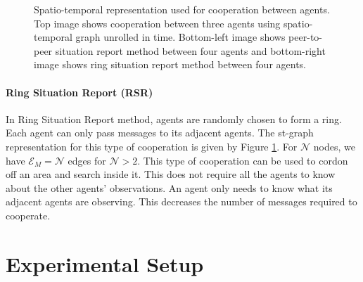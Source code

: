 \documentclass[conference]{IEEEtran}
\begin{document}
\begin{figure}[t]
        \vspace{1mm}
     \caption{Spatio-temporal representation used for cooperation between agents. Top image shows cooperation between three agents using spatio-temporal graph unrolled in time. Bottom-left image shows peer-to-peer situation report method between four agents and bottom-right image shows ring situation report method between four agents.}
     \label{fig:st-graph}
\end{figure}

\paragraph*{\textbf{Ring Situation Report (RSR)}}

In Ring Situation Report method, agents are randomly chosen to form a ring. Each agent can only pass messages to its adjacent agents. The st-graph representation for this type of cooperation is given by Figure \ref{fig:st-graph}. For $\mathcal{N}$ nodes, we have $\mathcal{E}_M= \mathcal{N}$ edges for $\mathcal{N}>2$. This type of cooperation can be used to cordon off an area and search inside it. This does not require all the agents to know about the other agents' observations. An agent only needs to know what its adjacent agents are observing. This decreases the number of messages required to cooperate.

\section{Experimental Setup}
\end{document}
